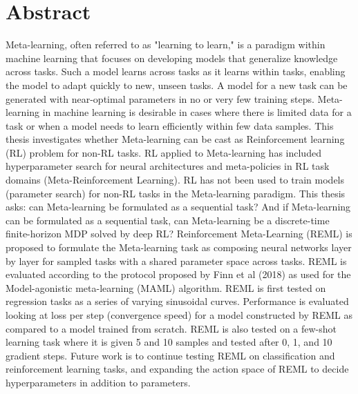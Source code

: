 \chapter*{Abstract}
\noindent Meta-learning, often referred to as "learning to learn," is a paradigm within machine learning 
that focuses on developing models that generalize knowledge across tasks. Such a model learns across 
tasks as it learns within tasks, enabling the model to adapt quickly to new, unseen tasks. A model for 
a new task can be generated with near-optimal parameters in no or very few training steps. Meta-learning 
in machine learning is desirable in cases where there is limited data for a task or when a model needs 
to learn efficiently within few data samples. This thesis investigates whether Meta-learning can be cast 
as Reinforcement learning (RL) problem for non-RL tasks. RL applied to Meta-learning has included 
hyperparameter search for neural architectures and meta-policies in RL task domains (Meta-Reinforcement 
Learning). RL has not been used to train models (parameter search) for non-RL tasks in the Meta-learning 
paradigm. This thesis asks: can Meta-learning be formulated as a sequential task? And if Meta-learning 
can be formulated as a sequential task, can Meta-learning be a discrete-time finite-horizon MDP solved 
by deep RL? Reinforcement Meta-Learning (REML) is proposed to formulate the Meta-learning task as 
composing neural networks layer by layer for sampled tasks with a shared parameter space across tasks. 
REML is evaluated according to the protocol proposed by Finn et al (2018) as used for the Model-agonistic 
meta-learning (MAML) algorithm. REML is first tested on regression tasks as a series of varying sinusoidal 
curves. Performance is evaluated looking at loss per step (convergence speed) for a model constructed by 
REML as compared to a model trained from scratch. REML is also tested on a few-shot learning task where 
it is given 5 and 10 samples and tested after 0, 1, and 10 gradient steps. Future work is to continue 
testing REML on classification and reinforcement learning tasks, and expanding  the action space of REML 
to decide hyperparameters in addition to parameters.
\clearpage